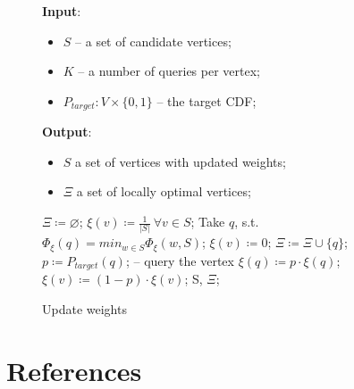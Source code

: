 \begin{figure}[H]
    \begin{framed}
        \begin{algorithmic}[1]
            \State \textbf{Input}:
            \begin{itemize}
            	\item $S$ -- a set of candidate vertices;
            	\item $K$ -- a number of queries per vertex;
            	\item $P_{target}: V \times \{0,1\}$ -- the target CDF;
            \end{itemize}
            
            \State \textbf{Output}:
			\begin{itemize}
            	\item $S$ a set of vertices with updated weights;
            	\item $\Xi$ a set of locally optimal vertices;
			\end{itemize}

			\State $\Xi \coloneqq \varnothing$;
			\State $\xi(v) \coloneqq \frac{1}{|S|}~\forall v \in S$;
                \State Take $q$, s.t. $\Phi_\xi(q) = min_{w \in S} \Phi_\xi(w, S)$;
                	\State $\xi(v) \coloneqq 0$;
                	\State $\Xi \coloneqq \Xi \cup \{q\}$;
                \Else
                	\State $p \coloneqq P_{target}(q)$; -- query the vertex
                	\State $\xi(q) \coloneqq p \cdot \xi(q)$;
                    	\State $\xi(v) \coloneqq (1 - p) \cdot \xi(v)$;
	                \EndFor
                \EndIf
            \EndFor
            \State \Return S, $\Xi$;
        \end{algorithmic}
    \end{framed}
    \caption{Update weights}
    \label{algWgt}
\end{figure}


\clearpage
\section{References}
\nocite{main, karp, benor, annals}
\printbibliography[heading=none]
